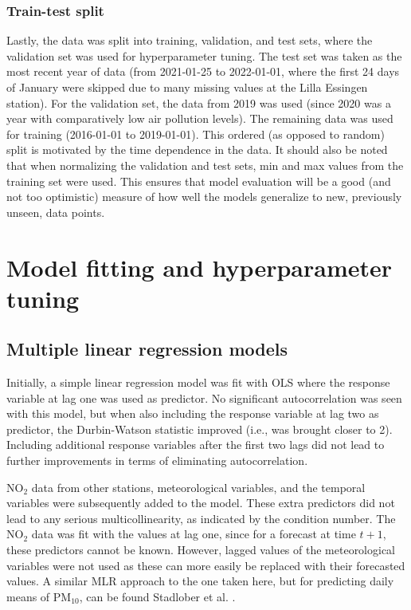 \subsubsection{Train-test split} 
Lastly, the data was split into training, validation, and test sets, where the validation set was used for hyperparameter tuning. The test set was taken as the most recent year of data (from 2021-01-25 to 2022-01-01, where the first 24 days of January were skipped due to many missing values at the Lilla Essingen station). For the validation set, the data from 2019 was used (since 2020 was a year with comparatively low air pollution levels). The remaining data was used for training (2016-01-01 to 2019-01-01). This ordered (as opposed to random) split is motivated by the time dependence in the data. It should also be noted that when normalizing the validation and test sets, min and max values from the training set were used. This ensures that model evaluation will be a good (and not too optimistic) measure of how well the models generalize to new, previously unseen, data points.

\section{Model fitting and hyperparameter tuning}
\label{sec:model_fitting_hp_tuning}

\subsection{Multiple linear regression models}
Initially, a simple linear regression model was fit with OLS where the response variable at lag one was used as predictor. No significant autocorrelation was seen with this model, but when also including the response variable at lag two as predictor, the Durbin-Watson statistic improved (i.e., was brought closer to 2). Including additional response variables after the first two lags did not lead to further improvements in terms of eliminating autocorrelation.

NO$_2$ data from other stations, meteorological variables, and the temporal variables were subsequently added to the model. These extra predictors did not lead to any serious multicollinearity, as indicated by the condition number. The NO$_2$ data was fit with the values at lag one, since for a forecast at time $t+1$, these predictors cannot be known. However, lagged values of the meteorological variables were not used as these can more easily be replaced with their forecasted values. A similar MLR approach to the one taken here, but for predicting daily means of PM$_{10}$, can be found Stadlober et al. \cite{Stadlober2008}. 

